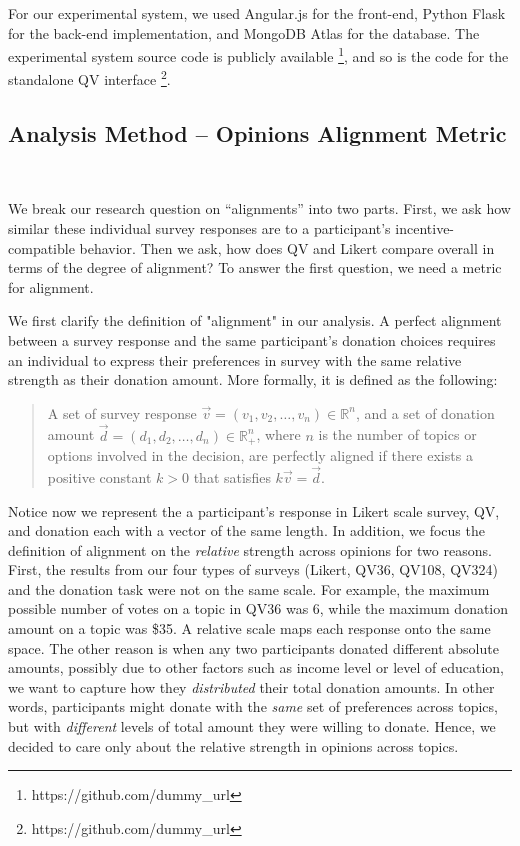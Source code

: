 For our experimental system, we used Angular.js for the front-end, Python Flask for the back-end implementation, and MongoDB Atlas for the database. The experimental system source code is publicly available \footnote{https://github.com/dummy\_url}, and so is the code for the standalone QV interface \footnote{https://github.com/dummy\_url}. 

\subsection{Analysis Method -- Opinions Alignment Metric}~\label{alignment_metric}

We break our research question on ``alignments'' into two parts. First, we ask how similar these individual survey responses are to a participant's incentive-compatible behavior. Then we ask, how does QV and Likert compare overall in terms of the degree of alignment? To answer the first question, we need a metric for alignment.

We first clarify the definition of "alignment" in our analysis. A perfect alignment between a survey response and the same participant's donation choices requires an individual to express their preferences in survey with the same relative strength as their donation amount. More formally, it is defined as the following:

\begin{quote}
    A set of survey response $\vec{v} = (v_1, v_2, \dots, v_n) \in \mathbb{R}^n$, and a set of donation amount $\vec{d} = (d_1, d_2, \dots, d_n)\in \mathbb{R}_{+}^n$, where $n$ is the number of topics or options involved in the decision, are perfectly aligned if there exists a positive constant $k>0$ that satisfies $k\vec{v} = \vec{d}$.
\end{quote}

Notice now we represent the a participant's response in Likert scale survey, QV, and donation each with a vector of the same length. In addition, we focus the definition of alignment on the \textit{relative} strength across opinions for two reasons. First, the results from our four types of surveys (Likert, QV36, QV108, QV324) and the donation task were not on the same scale. For example, the maximum possible number of votes on a topic in QV36 was 6, while the maximum donation amount on a topic was \$35. A relative scale maps each response onto the same space. The other reason is when any two participants donated different absolute amounts, possibly due to other factors such as income level or level of education, we want to capture how they \textit{distributed} their total donation amounts. In other words, participants might donate with the \textit{same} set of preferences across topics, but with \textit{different} levels of total amount they were willing to donate. Hence, we decided to care only about the relative strength in opinions across topics.

